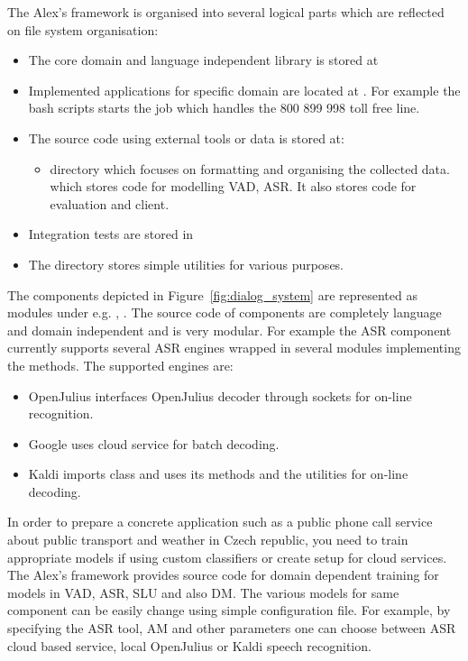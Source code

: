 The Alex's framework is organised into several logical parts which are reflected on file system organisation:
\begin{itemize}
    \item The core domain and language independent library is stored at 
    \item Implemented applications for specific domain are located at .
        For example the bash scripts  starts the job which handles the 800 899 998 toll free line.
    \item The source code using external tools or data is stored at:
        \begin{itemize}
            \item {} directory which focuses on formatting and organising the collected data.
            \term {} which stores code for modelling \ac{VAD}, \ac{ASR}. It also stores code for evaluation and  client.
        \end{itemize}
    \item Integration tests are stored in 
    \item The  directory stores simple utilities for various purposes.
\end{itemize}

The components depicted in Figure~\ref{fig:dialog_system} are represented as 
modules under  e.g. ,  .
The source code of components are completely language and domain independent and is very modular.
For example the \ac{ASR} component currently supports several \ac{ASR} engines wrapped in several modules
implementing the  methods. 
The supported engines are:
\begin{itemize}
    \item OpenJulius  interfaces OpenJulius decoder through sockets for on-line recognition.
    \item Google  uses cloud service for batch decoding.
    \item Kaldi  imports  class and uses its methods and the utilities for on-line decoding.
\end{itemize}

In order to prepare a concrete application such as a public phone call service about public transport and weather in Czech republic, you need to train appropriate models if using custom classifiers or create setup for cloud services.
The Alex's framework provides source code for domain dependent training for models in \ac{VAD}, \ac{ASR}, \ac{SLU} and also \ac{DM}.
The various models for same component can be easily change using simple configuration file. 
For example, by specifying the \ac{ASR} tool, \ac{AM} and other parameters one can choose between \ac{ASR} cloud based service, local OpenJulius or Kaldi speech recognition.



